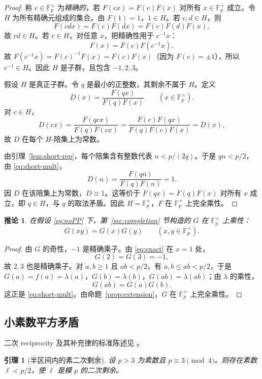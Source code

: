 \documentclass[11pt,a4paper]{ctexart}
\theoremstyle{plain}
\newtheorem{lemma}[theorem]{引理}
\newtheorem{corollary}[theorem]{推论}
\theoremstyle{definition}
\newcommand{\Fpx}{\mathbb{F}_p^{\times}}
\newcommand{\li}{\lambda}
\begin{document}
\begin{proof}
称 $c\in\Fpx$ 为\emph{精确的}，若 $F(cx)=F(c)F(x)$ 对所有 $x\in\Fpx$ 成立。令 $H$ 为所有精确元组成的集合。由 $F(1)=1$，$1\in H$。若 $c,d\in H$，则
\[
  F(cdx)=F(c)F(dx)=F(c)F(d)F(x),
\]
故 $cd\in H$。若 $c\in H$，对任意 $x$，把精确性用于 $c^{-1}x$：
\[
  F(x)=F(c)F(c^{-1}x),
\]
故 $F(c^{-1}x)=F(c)^{-1}F(x)=F(c)F(x)$（因为 $F(c)=\pm1$），所以 $c^{-1}\in H$。因此 $H$ 是子群，且包含 $-1,2,3$。

假设 $H$ 是真正子群。令 $q$ 是最小的正整数，其剩余不属于 $H$。定义
\[
  D(x)=\frac{F(qx)}{F(q)F(x)}\qquad(x\in\Fpx).
\]
对 $c\in H$，
\[
  D(cx)=\frac{F(qcx)}{F(q)F(cx)}
  =\frac{F(c)F(qx)}{F(q)F(c)F(x)}=D(x),
\]
故 $D$ 在每个 $H$-陪集上为常数。

由引理~\ref{lem:short-rep}，每个陪集含有整数代表 $n<p/(2q)$。于是 $qn<p/2$，由 \eqref{eq:short-mult}，
\[
  D(n)=\frac{F(qn)}{F(q)F(n)}=1.
\]
因 $D$ 在该陪集上为常数，$D\equiv1$。这等价于 $F(qx)=F(q)F(x)$ 对所有 $x$ 成立，即 $q\in H$，与 $q$ 的取法矛盾。因此 $H=\Fpx$，$F$ 在 $\Fpx$ 上完全乘性。
\end{proof}

\begin{corollary}
\label{cor:multiplicative}
在假设 \eqref{eq:noPP} 下，第~\ref{sec:completion} 节构造的 $G$ 在 $\Fpx$ 上乘性：
\[
  G(xy)=G(x)G(y)\qquad(x,y\in\Fpx).
\]
\end{corollary}

\begin{proof}
由 $G$ 的奇性，$-1$ 是精确乘子。由 \eqref{eq:exact} 在 $x=1$ 处，
\[
  G(2)=G(3)=-1,
\]
故 $2,3$ 也是精确乘子。对 $a,b\ge1$ 且 $ab<p/2$，有 $a,b\le ab<p/2$，于是 $G(a)=f(a)=\li(a)$，$G(b)=\li(b)$，$G(ab)=\li(ab)$；由 $\li$ 的乘性，
\[
  G(ab)=G(a)G(b).
\]
这正是 \eqref{eq:short-mult}。由命题~\ref{prop:extension}，$G$ 在 $\Fpx$ 上完全乘性。
\end{proof}

\subsection{小素数平方矛盾}
\label{sec:small-prime}

二次 reciprocity 及其补充律的标准陈述见 \cite[Chapter~5]{irelandrosen}。

\begin{lemma}[半区间内的素二次剩余]
\label{lem:small-prime}
设 $p>3$ 为素数且 $p\equiv3\pmod4$。则存在素数 $\ell<p/2$，使 $\ell$ 是模 $p$ 的二次剩余。
\end{lemma}
\end{document}
